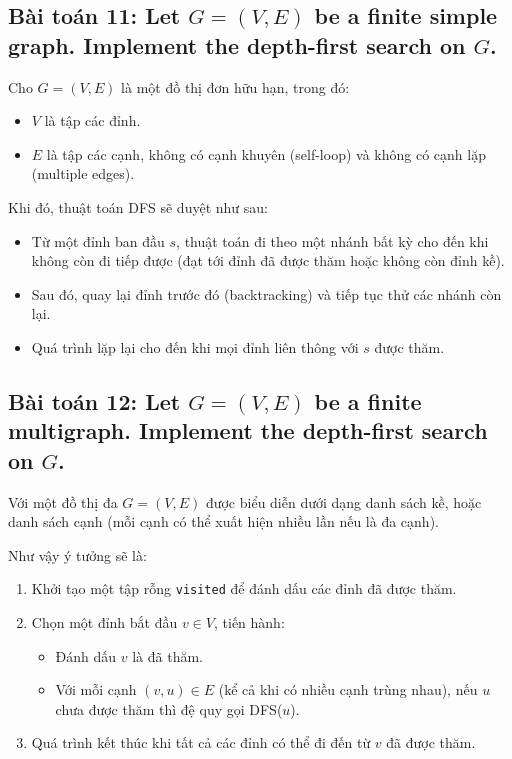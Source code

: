 \documentclass{article}
\begin{document}
	\subsection*{Bài toán 11:  Let $G = (V,E)$ be a finite simple graph. Implement the depth-first search on $G$.}
	
	Cho $G = (V, E)$ là một đồ thị đơn hữu hạn, trong đó:
	\begin{itemize}
		\item $V$ là tập các đỉnh.
		\item $E$ là tập các cạnh, không có cạnh khuyên (self-loop) và không có cạnh lặp (multiple edges).
	\end{itemize}
	
	Khi đó, thuật toán DFS sẽ duyệt như sau:
	
	\begin{itemize}
		\item Từ một đỉnh ban đầu $s$, thuật toán đi theo một nhánh bất kỳ cho đến khi không còn đi tiếp được (đạt tới đỉnh đã được thăm hoặc không còn đỉnh kề).
		\item Sau đó, quay lại đỉnh trước đó (backtracking) và tiếp tục thử các nhánh còn lại.
		\item Quá trình lặp lại cho đến khi mọi đỉnh liên thông với $s$ được thăm.
	\end{itemize}
	
	\subsection*{Bài toán 12: Let $G = (V,E)$ be a finite multigraph. Implement the depth-first search on $G$.}
	
		Với một đồ thị đa $G = (V, E)$ được biểu diễn dưới dạng danh sách kề, hoặc danh sách cạnh (mỗi cạnh có thể xuất hiện nhiều lần nếu là đa cạnh).
		
		Như vậy ý tưởng sẽ là:
		\begin{enumerate}
			\item Khởi tạo một tập rỗng \texttt{visited} để đánh dấu các đỉnh đã được thăm.
			\item Chọn một đỉnh bắt đầu $v \in V$, tiến hành:
			\begin{itemize}
				\item Đánh dấu $v$ là đã thăm.
				\item Với mỗi cạnh $(v, u) \in E$ (kể cả khi có nhiều cạnh trùng nhau), nếu $u$ chưa được thăm thì đệ quy gọi DFS($u$).
			\end{itemize}
			\item Quá trình kết thúc khi tất cả các đỉnh có thể đi đến từ $v$ đã được thăm.
		\end{enumerate}
		
\end{document}
